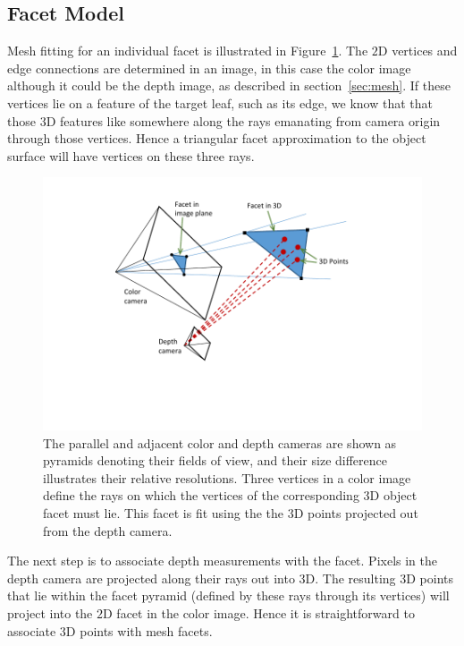 \subsection{Facet Model}

Mesh fitting for an individual facet is illustrated in Figure~\ref{fig:facet}.  The $2$D vertices and edge connections are determined in an image, in this case the color image although it could be the depth image, as described in section~\ref{sec:mesh}.  If these vertices lie on a feature of the target leaf, such as its edge, we know that that those $3$D features like somewhere along the rays emanating from camera origin through those vertices.  Hence a triangular facet approximation to the object surface will have vertices on these three rays.  

\begin{figure}
\begin{center}
   \includegraphics[trim=80 70 70 20,clip,width=0.95\linewidth]{Figures/pointFittingConcept}
\end{center}
   \caption{The parallel and adjacent color and depth cameras are shown as pyramids denoting their fields of view, and their size difference illustrates their relative resolutions.  Three vertices in a color image define the rays on which the vertices of the corresponding $3$D object facet must lie.  This facet is fit using the the $3$D points projected out from the depth camera.}
\label{fig:facet}
\end{figure}

The next step is to associate depth measurements with the facet.  Pixels in the depth camera are projected along their rays out into $3$D.  The resulting $3$D points that lie within the facet pyramid (defined by these rays through its vertices) will project into the $2$D facet in the color image.  Hence it is straightforward to associate $3$D points with mesh facets.  

